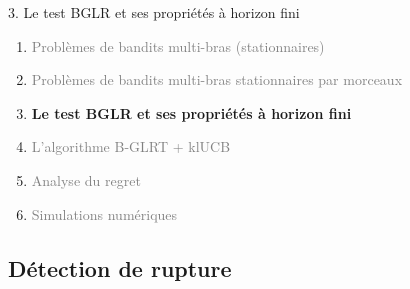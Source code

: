 \documentclass[11pt,french,ignorenonframetext,]{beamer}
\begin{document}
\begin{frame}{3. Le test BGLR et ses propriétés à horizon fini}

  \begin{enumerate}
    \item
    \textcolor{gray}{
      Problèmes de bandits multi-bras (stationnaires)
    }
    \vspace*{15pt}

    \item
    \textcolor{gray}{
      Problèmes de bandits multi-bras stationnaires par morceaux
    }
    \vspace*{15pt}

    \item
    \alert{\textbf{%
      Le test BGLR et ses propriétés à horizon fini
    }}
    \vspace*{15pt}

    \item
    \textcolor{gray}{
      L'algorithme B-GLRT + klUCB
    }
    \vspace*{15pt}

    \item
    \textcolor{gray}{
      Analyse du regret
    }
    \vspace*{15pt}

    \item
    \textcolor{gray}{
      Simulations numériques
    }
  \end{enumerate}

\end{frame}


\subsection{\hfill{}Détection de rupture\hfill{}}
\end{document}
